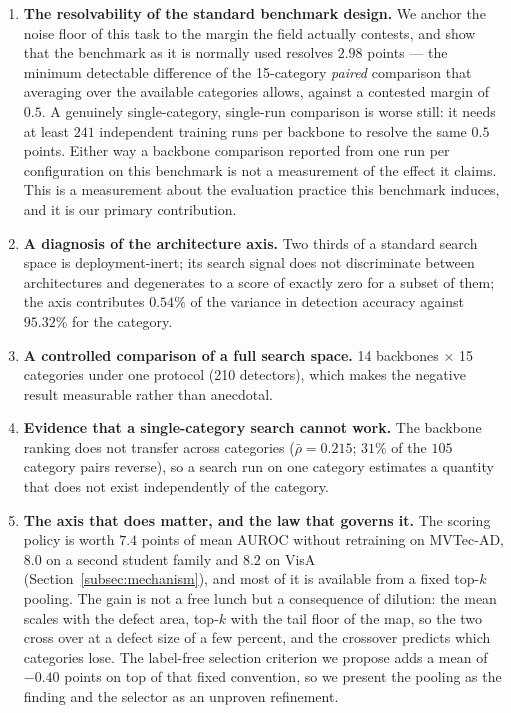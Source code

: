 \begin{enumerate}
  \item \textbf{The resolvability of the standard benchmark design.} We anchor the
  noise floor of this task to the margin the field actually contests, and show
  that the benchmark as it is normally used resolves $2.98$ points --- the minimum
  detectable difference of the 15-category \emph{paired} comparison that averaging
  over the available categories allows, against a contested margin of $0.5$. A
  genuinely single-category, single-run comparison is worse still: it needs at
  least $241$
  independent training runs per backbone to resolve the same $0.5$ points. Either
  way a backbone comparison reported from one run per configuration on this
  benchmark is not a measurement of the effect it claims. This is a measurement
  about the evaluation
  practice this benchmark induces, and it is our primary contribution.
  \item \textbf{A diagnosis of the architecture axis.} Two thirds of a standard
  search space is deployment-inert; its search signal does not discriminate
  between architectures and degenerates to a score of exactly zero for a subset of
  them; the axis contributes $0.54\%$ of the variance in detection accuracy
  against $95.32\%$ for the category.
  \item \textbf{A controlled comparison of a full search space.} 14 backbones
  $\times$ 15 categories under one protocol (210 detectors), which makes the
  negative result measurable rather than anecdotal.
  \item \textbf{Evidence that a single-category search cannot work.} The backbone
  ranking does not transfer across categories ($\bar\rho = 0.215$; $31\%$ of the
  $105$ category pairs reverse), so a search run on one category estimates a quantity
  that does not exist independently of the category.
  \item \textbf{The axis that does matter, and the law that governs it.} The
  scoring policy is worth $7.4$ points of mean AUROC without retraining on
  MVTec-AD, $8.0$ on a second student family and $8.2$ on VisA
  (Section~\ref{subsec:mechanism}), and most of it is available from a fixed
  top-$k$ pooling. The gain is not a free lunch but
  a consequence of dilution: the mean scales with the defect area, top-$k$ with
  the tail floor of the map, so the two cross over at a defect size of a few
  percent, and the crossover predicts which categories lose. The label-free
  selection criterion we propose adds a mean of $-0.40$ points on top of that
  fixed convention, so we present the pooling as the finding and the selector as
  an unproven refinement.
\end{enumerate}

